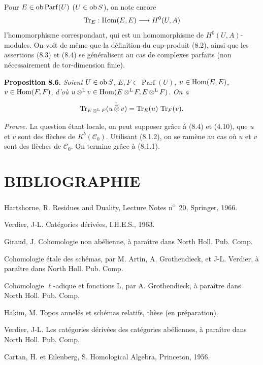 \documentclass[11pt]{article}
\newcommand{\Parf}{\operatorname{Parf}}
\begin{document}
Pour \(E\in\Ob\Parf(U)\) (\(U\in\operatorname{ob} S\)), on note encore
\[
  \operatorname{Tr}_E:\operatorname{Hom}(E,E)\longrightarrow H^0(U,A)
\]
l'homomorphisme correspondant, qui est un homomorphisme de \(H^0(U,A)\)-modules. On voit de même que la définition du cup-produit (8.2), ainsi que les assertions (8.3) et (8.4) se généralisent au cas de complexes parfaits (non nécessairement de tor-dimension finie).

\textbf{Proposition 8.6.} \emph{Soient} \(U\in\operatorname{ob} S\), \(E,F\in\Parf(U)\), \(u\in\operatorname{Hom}(E,E)\), \(v\in\operatorname{Hom}(F,F)\), \emph{d'où} \(u\mathop{\otimes}^{\mathrm L} v\in\operatorname{Hom}(E\mathop{\otimes}^{\mathrm L} F,E\mathop{\otimes}^{\mathrm L} F)\). \emph{On a}
\[
  \operatorname{Tr}_{E\mathop{\otimes}^{\mathrm L} F}(u\mathop{\otimes}^{\mathrm L} v)=\operatorname{Tr}_E(u)\,\operatorname{Tr}_F(v).
\]

\emph{Preuve.} La question étant locale, on peut supposer grâce à (8.4) et (4.10), que \(u\) et \(v\) sont des flèches de \(K^b(\mathcal C_0)\). Utilisant (8.1.2), on se ramène au cas où \(u\) et \(v\) sont des flèches de \(\mathcal C_0\). On termine grâce à (8.1.1).

\section*{BIBLIOGRAPHIE}
\begin{description}[leftmargin=2.5cm,style=nextline]
\item[{[H]}]
Hartshorne, R. Residues and Duality, Lecture Notes n\textsuperscript{o}~20, Springer, 1966.
\item[{[V]}] Verdier, J-L. Catégories dérivées, I.H.E.S., 1963.
\item[{[G]}] Giraud, J. Cohomologie non abélienne, à paraître dans North Holl. Pub. Comp.
\item[{SGA 4}] Cohomologie étale des schémas, par M. Artin, A. Grothendieck, et J-L. Verdier, à paraître dans North Holl. Pub. Comp.
\item[{SGA 5}] Cohomologie \(\ell\)-adique et fonctions L, par A. Grothendieck, à paraître dans North Holl. Pub. Comp.
\item[{[1]}] Hakim, M. Topos annelés et schémas relatifs, thèse (en préparation).
\item[{[2]}] Verdier, J-L. Les catégories dérivées des catégories abéliennes, à paraître dans North Holl. Pub. Comp.
\item[{[MULT]}] Cartan, H. et Eilenberg, S. Homological Algebra, Princeton, 1956.
\end{description}
\end{document}
